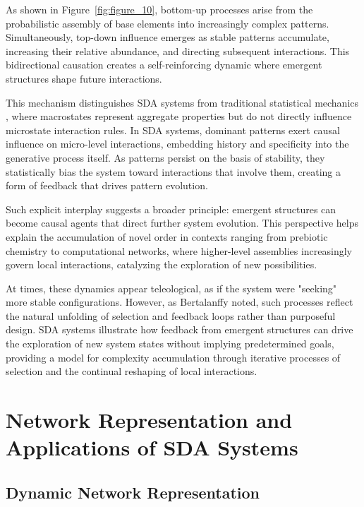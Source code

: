 \documentclass[preprint,12pt]{elsarticle}
\begin{document}
As shown in Figure~\ref{fig:figure_10}, bottom-up processes arise from the probabilistic assembly of base elements into increasingly complex patterns. Simultaneously, top-down influence emerges as stable patterns accumulate, increasing their relative abundance, and directing subsequent interactions. This bidirectional causation creates a self-reinforcing dynamic where emergent structures shape future interactions.

This mechanism distinguishes SDA systems from traditional statistical mechanics \cite{landau1980statistical}, where macrostates represent aggregate properties but do not directly influence microstate interaction rules. In SDA systems, dominant patterns exert causal influence on micro-level interactions, embedding history and specificity into the generative process itself. As patterns persist on the basis of stability, they statistically bias the system toward interactions that involve them, creating a form of feedback that drives pattern evolution.

Such explicit interplay suggests a broader principle: emergent structures can become causal agents that direct further system evolution. This perspective helps explain the accumulation of novel order in contexts ranging from prebiotic chemistry to computational networks, where higher-level assemblies increasingly govern local interactions, catalyzing the exploration of new possibilities.

At times, these dynamics appear teleological, as if the system were "seeking" more stable configurations. However, as Bertalanffy \cite{bertalanffy1968general} noted, such processes reflect the natural unfolding of selection and feedback loops rather than purposeful design. SDA systems illustrate how feedback from emergent structures can drive the exploration of new system states without implying predetermined goals, providing a model for complexity accumulation through iterative processes of selection and the continual reshaping of local interactions.

\section{Network Representation and Applications of SDA Systems}

\subsection{Dynamic Network Representation}
\end{document}
